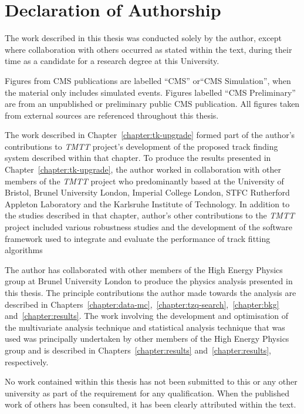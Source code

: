\documentclass[11pt,a4paper]{report}
\begin{document}
\chapter*{Declaration of Authorship} \label{sec:declaration}
The work described in this thesis was conducted solely by the author, except where collaboration with others occurred as stated within the text, during their time as a candidate for a research degree at this University.

Figures from CMS publications are labelled ``CMS'' or``CMS Simulation'', when the material only includes simulated events.
Figures labelled ``CMS Preliminary'' are from an unpublished or preliminary public CMS publication.
All figures taken from external sources are referenced throughout this thesis.

The work described in Chapter~\ref{chapter:tk-upgrade} formed part of the author's contributions to \emph{TMTT} project's development of the proposed track finding system described within that chapter.
To produce the results presented in Chapter~\ref{chapter:tk-upgrade}, the author worked in collaboration with other members of the \emph{TMTT} project who predominantly based at the University of Bristol, Brunel University London, Imperial College London, STFC Rutherford Appleton Laboratory and the Karlsruhe Institute of Technology.
In addition to the studies described in that chapter, author's other contributions to the \emph{TMTT} project included various robustness studies and the development of the software framework used to integrate and evaluate the performance of track fitting algorithms

The author has collaborated with other members of the High Energy Physics group at Brunel University London to produce the physics analysis presented in this thesis.
The principle contributions the author made towards the analysis are described in Chapters~\ref{chapter:data-mc},~\ref{chapter:tzq-search},~\ref{chapter:bkg} and~\ref{chapter:results}.
The work involving the development and optimisation of the multivariate analysis technique and statistical analysis technique that was used was principally undertaken by other members of the High Energy Physics group and is described in Chapters~\ref{chapter:results} and~\ref{chapter:results}, respectively.


No work contained within this thesis has not been submitted to this or any other university as part of the requirement for any qualification.
When the published work of others has been consulted, it has been clearly attributed within the text.
\end{document}
